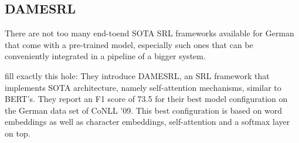 

\subsection{DAMESRL}

There are not too many end-toend SOTA SRL frameworks available for German that come with a pre-trained model,
especially such ones that can be conveniently integrated in a pipeline of a bigger system.

\cite{do2018flexible} fill exactly this hole: They introduce DAMESRL, an SRL framework
that implements SOTA architecture, namely self-attention mechanisms, similar to BERT's.
They report an F1 score of 73.5 for their best model configuration on the German data set
of CoNLL '09. This best configuration is based on word embeddings as well as character
embeddings, self-attention and a softmax layer on top.

